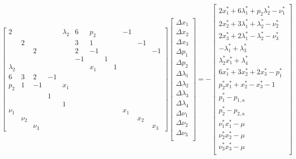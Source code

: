 \documentclass[letter, 11pt]{article}
\begin{document}
\begin{equation}  \label{eq:exr:newton}
  \left[
    \begin{array}{cccccccccccc}
      2&&&&\lambda_2&6&p_2&&&-1\\
      &2&&&&3&1&&&&-1\\
      &&2&&&2&-1&&&&&-1\\
      &&&&&-1&&1\\
      \lambda_2&&&&&&x_1&&1\\
      6&3&2&-1\\
      p_2&1&-1&&x_1\\
      &&&1\\
      &&&&1\\
      \nu_1&&&&&&&&&x_1\\
      &\nu_2&&&&&&&&&x_2\\
      &&\nu_3&&&&&&&&&x_3
    \end{array}
  \right]
  \left[
    \begin{array}{c}
      \Delta x_1\\
      \Delta x_2\\
      \Delta x_3\\
      \Delta p_1\\
      \Delta p_2\\
      \Delta \lambda_1\\
      \Delta \lambda_2\\
      \Delta \lambda_3\\
      \Delta \lambda_4\\
      \Delta \nu_1\\
      \Delta \nu_2\\
      \Delta \nu_3\\
    \end{array}
  \right]
  =-
  \left[
    \begin{array}{c}
      2x^{*}_1+6\lambda^{*}_1+p_2\lambda^{*}_2-\nu^{*}_1\\
      2x^{*}_2+3\lambda^{*}_1+\lambda^{*}_2-\nu^{*}_2\\
      2x^{*}_3+2\lambda^{*}_1-\lambda^{*}_2-\nu^{*}_3\\
      -\lambda^{*}_1+\lambda^{*}_3\\
      \lambda^{*}_2x^{*}_1+\lambda^{*}_4\\
      6x^{*}_1+3x^{*}_2+2x^{*}_3-p^{*}_1\\
      p^{*}_2x^{*}_1+x^{*}_2-x^{*}_3-1\\
      p^{*}_1-p_{1,a}\\
      p^{*}_2-p_{2,a}\\
      \nu^{*}_1x^{*}_1-\mu\\
      \nu^{*}_2x^{*}_2-\mu\\
      \nu^{*}_3x^{*}_3-\mu\\
    \end{array}
  \right]
\end{equation}
\end{document}
